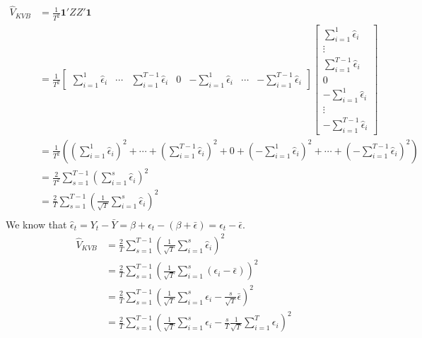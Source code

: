 \documentclass[DIV=14,titlepage=false]{scrreprt}
\begin{document}
    \begin{align*}
        \hat V_{KVB} &= \frac{1}{T^2} \mathbf{1'}ZZ'\mathbf{1}\\
        &= \frac{1}{T^2} 
        \begin{bmatrix}
            \sum_{i=1}^{1} \hat \epsilon_i & \cdots & \sum_{i=1}^{T-1} \hat \epsilon_i & 0 & - \sum_{i=1}^{1} \hat \epsilon_i & \cdots & - \sum_{i=1}^{T-1} \hat \epsilon_i
        \end{bmatrix}
        \begin{bmatrix}
            \sum_{i=1}^{1} \hat \epsilon_i \\
            \vdots\\
            \sum_{i=1}^{T-1} \hat \epsilon_i \\
            0\\
            - \sum_{i=1}^{1} \hat \epsilon_i\\
            \vdots\\
            - \sum_{i=1}^{T-1} \hat \epsilon_i
        \end{bmatrix}\\
        &= \frac{1}{T^2} \left( \left(\sum_{i=1}^{1} \hat \epsilon_i\right)^2 +  \cdots + \left(\sum_{i=1}^{T-1} \hat \epsilon_i\right)^2 + 0 + \left(- \sum_{i=1}^{1} \hat \epsilon_i\right)^2 + \cdots + \left(- \sum_{i=1}^{T-1} \hat \epsilon_i\right)^2 \right)\\
        &= \frac{2}{T^2} \sum_{s=1}^{T-1} \left(\sum_{i=1}^{s}\hat \epsilon_i\right)^2\\
        &= \frac{2}{T} \sum_{s=1}^{T-1} \left(\frac{1}{\sqrt{T}}\sum_{i=1}^{s}\hat \epsilon_i\right)^2\\
    \end{align*}
    We know that $\hat \epsilon_t = Y_t - \bar Y=\beta + \epsilon_t - (\beta +\bar \epsilon) = \epsilon_t - \bar \epsilon$.
    \begin{align*}
        \hat V_{KVB} &= \frac{2}{T} \sum_{s=1}^{T-1} \left(\frac{1}{\sqrt{T}}\sum_{i=1}^{s}\hat \epsilon_i\right)^2\\
        &= \frac{2}{T} \sum_{s=1}^{T-1} \left(\frac{1}{\sqrt{T}}\sum_{i=1}^{s}(\epsilon_i - \bar \epsilon)\right)^2\\
        &= \frac{2}{T} \sum_{s=1}^{T-1} \left(\frac{1}{\sqrt{T}}\sum_{i=1}^{s}\epsilon_i -\frac{s}{\sqrt{T}} \bar \epsilon\right)^2\\
        &= \frac{2}{T} \sum_{s=1}^{T-1} \left(\frac{1}{\sqrt{T}}\sum_{i=1}^{s}\epsilon_i -\frac{s}{T}\frac{1}{\sqrt{T}} \sum_{i=1}^{T}\epsilon_i\right)^2\\
    \end{align*}
\end{document}
